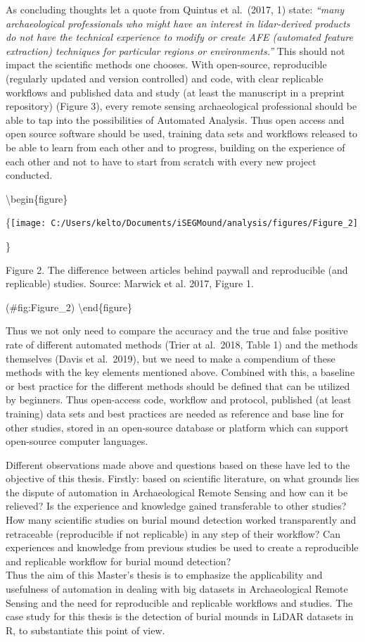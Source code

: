\documentclass[
]{article}
\begin{document}
As concluding thoughts let a quote from Quintus et al.~(2017, 1) state: \emph{``many archaeological professionals who might have an interest in lidar-derived products do not have the technical experience to modify or create AFE (automated feature extraction) techniques for particular regions or environments.''} This should not impact the scientific methods one chooses. With open-source, reproducible (regularly updated and version controlled) and code, with clear replicable workflows and published data and study (at least the manuscript in a preprint repository) (Figure 3), every remote sensing archaeological professional should be able to tap into the possibilities of Automated Analysis. Thus open access and open source software should be used, training data sets and workflows released to be able to learn from each other and to progress, building on the experience of each other and not to have to start from scratch with every new project conducted.

\textbackslash begin\{figure\}

\{\centering \texttt{[image: C:/Users/kelto/Documents/iSEGMound/analysis/figures/Figure\_2]}

\}

\caption{Figure 2. The difference between articles behind paywall and reproducible (and replicable) studies. Source: Marwick et al. 2017, Figure 1.}

(\#fig:Figure\_2)
\textbackslash end\{figure\}

Thus we not only need to compare the accuracy and the true and false positive rate of different automated methods (Trier at al.~2018, Table 1) and the methods themselves (Davis et al.~2019), but we need to make a compendium of these methods with the key elements mentioned above. Combined with this, a baseline or best practice for the different methods should be defined that can be utilized by beginners. Thus open-access code, workflow and protocol, published (at least training) data sets and best practices are needed as reference and base line for other studies, stored in an open-source database or platform which can support open-source computer languages.

Different observations made above and questions based on these have led to the objective of this thesis. Firstly: based on scientific literature, on what grounds lies the dispute of automation in Archaeological Remote Sensing and how can it be relieved? Is the experience and knowledge gained transferable to other studies? How many scientific studies on burial mound detection worked transparently and retraceable (reproducible if not replicable) in any step of their workflow? Can experiences and knowledge from previous studies be used to create a reproducible and replicable workflow for burial mound detection?\\
Thus the aim of this Master's thesis is to emphasize the applicability and usefulness of automation in dealing with big datasets in Archaeological Remote Sensing and the need for reproducible and replicable workflows and studies. The case study for this thesis is the detection of burial mounds in LiDAR datasets in R, to substantiate this point of view.
\end{document}
